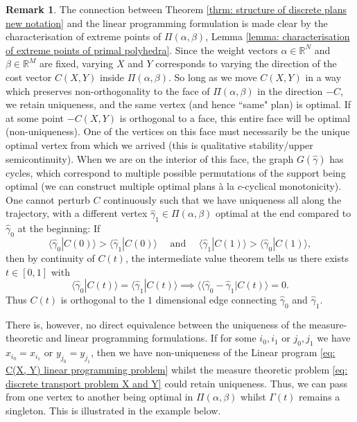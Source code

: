 \documentclass[11pt, oneside, titlepage]{book}
\theoremstyle{plain}
\theoremstyle{definition}
\newtheorem{remark}[theorem]{Remark}
\newcommand{\R}{\mathbb{R}}
\begin{document}
\begin{remark}
The connection between Theorem \ref{thrm: structure of discrete plans new notation} and the linear programming formulation is made clear by the characterisation of extreme points of $\Pi(\alpha, \beta)$, Lemma \ref{lemma: characterisation of extreme points of primal polyhedra}. Since the weight vectors $\alpha \in \R^N$ and $\beta \in \R^M$ are fixed, varying $X$ and $Y$ corresponds to varying the direction of the cost vector $C(X, Y)$ inside $\Pi(\alpha, \beta)$. So long as we move $C(X, Y)$ in a way which preserves non-orthogonality to the face of $\Pi(\alpha, \beta)$ in the direction $-C$, we retain uniqueness, and the same vertex (and hence ``same" plan) is optimal. If at some point $-C(X, Y)$ is orthogonal to a face, this entire face will be optimal (non-uniqueness). One of the vertices on this face must necessarily be the unique optimal vertex from which we arrived (this is qualitative stability/upper semicontinuity). When we are on the interior of this face, the graph $G(\hat\gamma)$ has cycles, which correspond to multiple possible permutations of the support being optimal (we can construct multiple optimal plans à la $c$-cyclical monotonicity).
One cannot perturb $C$ continuously such that we have uniqueness all along the trajectory, with a different vertex $\hat\gamma_1 \in \Pi(\alpha, \beta)$ optimal at the end compared to $\hat\gamma_0$ at the beginning: If
\begin{equation*}
    \langle \hat \gamma_0 | C(0) \rangle > \langle\hat\gamma_1 |C(0) \rangle \quad \text{ and } \quad \langle \hat \gamma_1 | C(1) \rangle > \langle\hat\gamma_0 |C(1) \rangle,
\end{equation*}
then by continuity of $C(t)$, the intermediate value theorem tells us there exists $t \in [0, 1]$ with
\begin{equation*}
    \langle \hat \gamma_0 | C(t) \rangle = \langle \hat \gamma_1 | C(t) \rangle \implies \langle \langle \hat \gamma_0 - \hat\gamma_1 | C(t) \rangle =0.
\end{equation*}
Thus $C(t)$ is orthogonal to the $1$ dimensional edge connecting $\hat\gamma_0$ and $\hat \gamma_1$.

There is, however, no direct equivalence between the uniqueness of the measure-theoretic and linear programming formulations. If for some $i_0, i_1$ or $j_0, j_1$ we have $x_{i_0} = x_{i_1}$ or $y_{j_0} = y_{j_1}$, then we have non-uniqueness of the Linear program \eqref{eq: C(X, Y) linear programming problem} whilst the measure theoretic problem \eqref{eq: discrete transport problem X and Y} could retain uniqueness. Thus, we can pass from one vertex to another being optimal in $\Pi(\alpha, \beta)$ whilst $\Gamma(t)$ remains a singleton. This is illustrated in the example below.
\end{remark}
\end{document}
